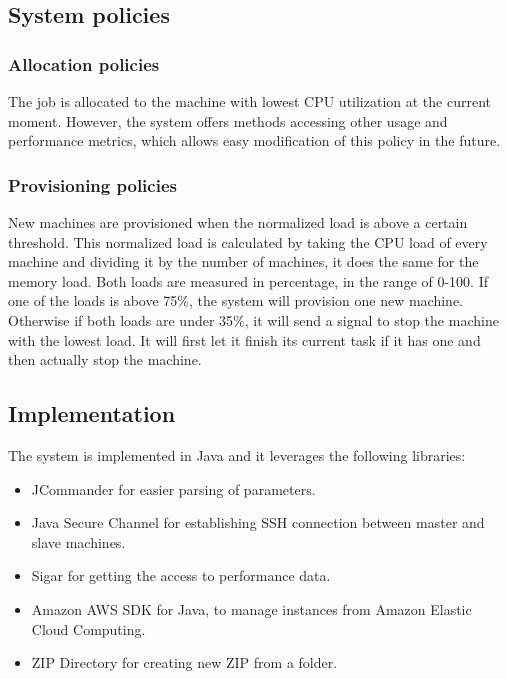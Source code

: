 \subsection{System policies}
\subsubsection{Allocation policies}
The job is allocated to the machine with lowest CPU utilization at the current moment. However, the system offers methods accessing other usage and performance metrics, which allows easy modification of this policy in the future.
\subsubsection{Provisioning policies}
New machines are provisioned when the normalized load is above a certain threshold. This normalized load is calculated by taking the CPU load of every machine and dividing it by the number of machines, it does the same for the memory load. Both loads are measured in percentage, in the range of 0-100. If one of the loads is above 75\%, the system will provision one new machine. Otherwise if both loads are under 35\%, it will send a signal to stop the machine with the lowest load. It will first let it finish its current task if it has one and then actually stop the machine.
\subsection{Implementation}
The system is implemented in Java and it leverages the following libraries:
\begin{itemize}
 \item JCommander\cite{jcommander} for easier parsing of parameters.
 \item Java Secure Channel\cite{jsch} for establishing SSH connection between master and slave machines.
 \item Sigar\cite{sigar} for getting the access to performance data.
 \item Amazon AWS SDK for Java\cite{aws}, to manage instances from Amazon Elastic Cloud Computing.
 \item ZIP Directory\cite{zip} for creating new ZIP from a folder.
\end{itemize}



